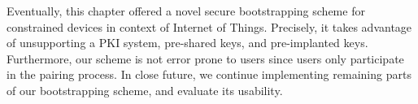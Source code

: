 Eventually, this chapter offered a novel secure bootstrapping scheme for constrained devices in context of Internet of Things. Precisely, it takes advantage of unsupporting a PKI system, pre-shared keys, and pre-implanted keys. Furthermore, our scheme is not error prone to users since users only participate in the pairing process. In close future, we continue implementing remaining parts of our bootstrapping scheme, and evaluate its usability.





